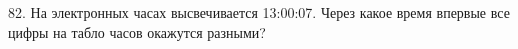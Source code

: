 82. На электронных часах высвечивается 13:00:07. Через какое время впервые все цифры на табло часов окажутся разными?\\
